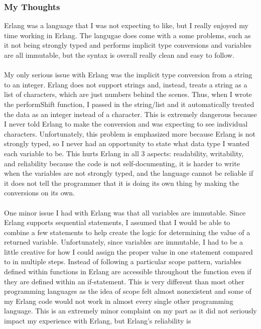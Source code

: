 \documentclass[letterpaper, 10pt, DIV=13]{scrartcl}
\numberwithin{equation}{section}
\numberwithin{figure}{section}
\numberwithin{table}{section}
\begin{document}
\subsubsection{My Thoughts}
Erlang was a language that I was not expecting to like, but I really enjoyed my time working in Erlang. The langugae does come with a some problems,
such as it not being strongly typed and performs implicit type conversions and variables are all immutable, but the syntax is overall really clean and easy to follow.
\\ \\
My only serious issue with Erlang was the implicit type conversion from a string to an integer. Erlang does not support strings and, instead, treats
a string as a list of characters, which are just numbers behind the scenes. Thus, when I wrote the performShift function, I passed in the string/list
and it automatically treated the data as an integer instead of a character. This is extremely dangerous because I never told Erlang to make the conversion
and was expecting to see individual characters. Unfortunately, this problem is emphasized more because Erlang is not strongly typed, so I never had an
opportunity to state what data type I wanted each variable to be. This hurts Erlang in all 3 aspects: readability, writability, and reliability because
the code is not self-documenting, it is harder to write when the variables are not strongly typed, and the language cannot be reliable if it does not tell
the programmer that it is doing its own thing by making the conversions on its own.
\\ \\
One minor issue I had with Erlang was that all variables are immutable. Since Erlang supports sequential statements, I assumed that I would be able
to combine a few statements to help create the logic for determining the value of a returned variable. Unfortunately, since variables are immutable, I had to
be a little creative for how I could assign the proper value in one statement compared to in multiple steps. Instead of following a particular scope pattern,
variables defined within functions in Erlang are accessible throughout the function even if they are defined within an if-statement. This is very different
than most other programming languages as the idea of scope felt almost nonexistent and some of my Erlang code would not work in almost every single other 
programming language. This is an extremely minor complaint on my part as it did not seriously impact my experience with Erlang, but Erlang's reliability is
\end{document}
